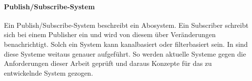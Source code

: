 \paragraph{Publish/Subscribe-System} Ein Publish/Subscribe-System beschreibt ein Abosystem. Ein Subscriber schreibt sich bei einem Publisher ein und wird von diesem über Veränderungen benachrichtigt. Solch ein System kann kanalbasiert oder filterbasiert sein. In  sind diese Systeme weitaus genauer aufgeführt. So werden aktuelle Systeme gegen die Anforderungen dieser Arbeit geprüft und daraus Konzepte für das zu entwickelnde System gezogen.











